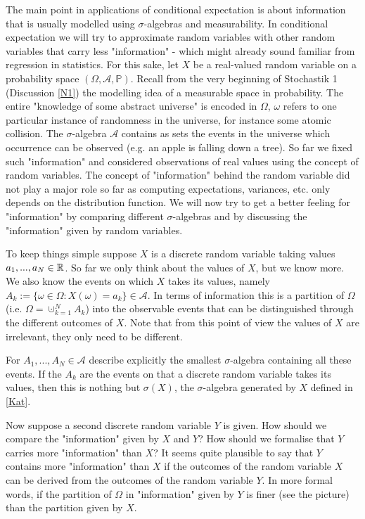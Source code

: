 	The main point in applications of conditional expectation is about information that is usually modelled using $\sigma$-algebras and measurability. In conditional expectation we will try to approximate random variables with other random variables that carry less "{}information"{} - which might already sound familiar from regression in statistics. For this sake, let $X$ be a real-valued random variable on a probability space $(\Omega, \mathcal A,\mathbb P)$. Recall from the very beginning of Stochastik 1 (Discussion \ref{N1}) the modelling idea of a measurable space in probability. The entire "{}knowledge of some abstract universe"{} is encoded in $\Omega$, $\omega$ refers to one particular instance of randomness in the universe, for instance some atomic collision. The $\sigma$-algebra $\mathcal A$ contains as sets the events in the universe which occurrence can be observed (e.g. an apple is falling down a tree). So far we fixed such "{}information"{} and considered observations of real values using the concept of random variables. The concept of "{}information"{} behind the random variable did not play a major role so far as computing expectations, variances, etc. only depends on the distribution function. We will now try to get a better feeling for "{}information"{} by comparing different $\sigma$-algebras and by discussing the "{}information"{} given by random variables.\smallskip
	
	To keep things simple suppose $X$ is a discrete random variable taking values $a_1,...,a_N\in\mathbb{R}$. So far we only think about the values of $X$, but we know more. We also know the events on which $X$ takes its values, namely $A_k:=\{\omega \in\Omega: X(\omega)=a_k\}\in \mathcal A$. In terms of information this is a partition of $\Omega$ (i.e. $\Omega=\cupdot_{k=1}^N A_k$) into the observable events that can be distinguished through the different outcomes of $X$.  Note that from this point of view the values of $X$ are irrelevant, they only need to be different. 
		\begin{luebung}
			For $A_1, ..., A_N\in \mathcal A$ describe explicitly the smallest $\sigma$-algebra containing all these events. If the $A_k$ are the events on that a discrete random variable takes its values, then this is nothing but $\sigma(X)$, the $\sigma$-algebra generated by $X$ defined in \ref{Kat}.
	\end{luebung}	
	Now suppose a second discrete random variable $Y$ is given. How should we compare the "{}information"{} given by $X$ and $Y$? How should we formalise that $Y$ carries more "{}information"{} than $X$? It seems quite plausible to say that $Y$ contains more "{}information"{} than $X$ if the outcomes of the random variable $X$ can be derived from the outcomes of the random variable $Y$. In more formal words, if the partition of $\Omega$ in "{}information"{} given by $Y$ is finer (see the picture) than the partition given by $X$. 
	 
